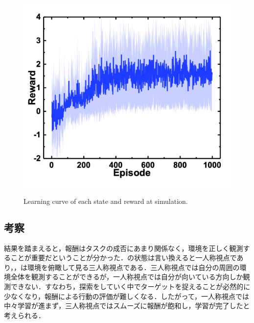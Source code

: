 \begin{figure}
\begin{minipage}[t]{0.45\linewidth}
        \label{fig:報酬距離}
    \end{minipage}
    \begin{minipage}[t]{0.5\linewidth}
        \centering
        \includegraphics[width=0.95\linewidth]{figure/chapter3/QL_rew=redArea_obs=posvec_origin}
        \label{fig:報酬面積}
    \end{minipage}
    \caption{Learning curve of each state and reward at simulation.}
    \label{fig:シミュレーション結果}
\end{figure}


\subsection{考察}
結果を踏まえると，報酬はタスクの成否にあまり関係なく，環境を正しく観測することが重要だということが分かった．の状態は言い換えると一人称視点であり，，は環境を俯瞰して見る三人称視点である．三人称視点では自分の周囲の環境全体を観測することができるが，一人称視点では自分が向いている方向しか観測できない．すなわち，探索をしていく中でターゲットを捉えることが必然的に少なくなり，報酬による行動の評価が難しくなる．したがって，一人称視点では中々学習が進まず，三人称視点ではスムーズに報酬が飽和し，学習が完了したと考えられる．


